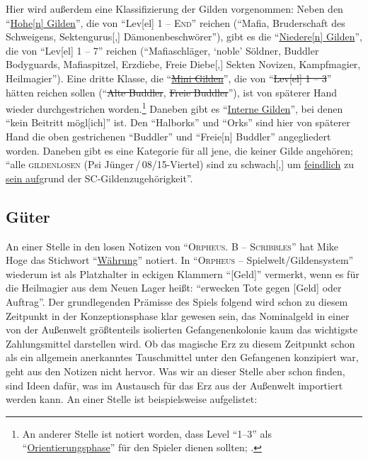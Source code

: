 \documentclass[a5paper,pagesize,numbers=noenddot]{scrbook}
\begin{document}
Hier wird außerdem eine Klassifizierung der Gilden vorgenommen:
Neben den \enquote{\uline{Hohe[n] Gilden}}, die von \enquote{Lev[el] 1 -- \textsc{End}} reichen (\enquote{Mafia, Bruderschaft des Schweigens, Sektengurus[,] Dämonenbeschwörer}), gibt es die \enquote{\uline{Niedere[n] Gilden}}, die von \enquote{Lev[el] 1 -- 7} reichen (\enquote{Mafiaschläger, \enquote{noble} Söldner, Buddler Bodyguards, Mafiaspitzel, Erzdiebe, Freie Diebe[,] Sekten Novizen, Kampfmagier, Heilmagier}).
Eine dritte Klasse, die \enquote{\uline{\sout{Mini Gilden}}}, die von \enquote{\sout{Lev[el] 1 -- 3}} hätten reichen sollen (\enquote{\sout{Alte Buddler}, \sout{Freie Buddler}}), ist von späterer Hand wieder durchgestrichen worden.\footnote{An anderer Stelle ist notiert worden, dass Level \enquote{1--3} als \enquote{\uline{Orientierungsphase}} für den Spieler dienen sollten; \autocite[S.~10]{orpheus_b_scribbles}.}
Daneben gibt es \enquote{\uline{Interne Gilden}}, bei denen \enquote{kein Beitritt mögl[ich]} ist.
Den \enquote{Halborks} und \enquote{Orks} sind hier von späterer Hand die oben gestrichenen \enquote{Buddler} und \enquote{Freie[n] Buddler} angegliedert worden.
Daneben gibt es eine Kategorie für all jene, die keiner Gilde angehören; \enquote{alle \textsc{gildenlosen} (Psi Jünger\,/\,08/15-Viertel) sind zu schwach[,] um \uline{feindlich} zu \uline{sein auf}grund der SC-Gildenzugehörigkeit}.


\subsection{Güter}\label{sec:orpheus_welt_gueter}
An einer Stelle in den losen Notizen von \enquote{\textsc{Orpheus. B -- Scribbles}} hat Mike Hoge das Stichwort \enquote{\uline{Währung}} notiert.\autocite[S.~6]{orpheus_b_scribbles}
In \enquote{\textsc{Orpheus} -- Spielwelt/Gildensys\-tem} wiederum ist als Platzhalter in eckigen Klammern \enquote{[Geld]} vermerkt, wenn es für die Heilmagier aus dem Neuen Lager heißt:
\enquote{erwecken Tote gegen [Geld] oder Auftrag}.\autocite[S.~7]{orpheus_gildensystem}
Der grundlegenden Prämisse des Spiels folgend wird schon zu diesem Zeitpunkt in der Konzeptionsphase klar gewesen sein, das Nominalgeld in einer von der Außenwelt größtenteils isolierten Gefangenenkolonie kaum das wichtigste Zahlungsmittel darstellen wird.
Ob das magische Erz zu diesem Zeitpunkt schon als ein allgemein anerkanntes Tauschmittel unter den Gefangenen konzipiert war, geht aus den Notizen nicht hervor. %
Was wir an dieser Stelle aber schon finden, sind Ideen dafür, was im Austausch für das Erz aus der Außenwelt importiert werden kann.
An einer Stelle ist beispielsweise aufgelistet:
\end{document}
